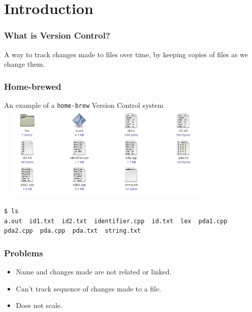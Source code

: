 \documentclass[14pt,compress]{beamer}
\newcommand{\typ}[1]{\lstinline{#1}}
\begin{document}

\section{Introduction}

\begin{frame}
  \frametitle{What is Version Control?}
  \begin{block}{}
    A way to track changes made to files over time, by keeping copies
    of files as we change them.
  \end{block}
\end{frame}

\begin{frame}[fragile]
  \frametitle{Home-brewed}
  \begin{center}
    An example of a \typ{home-brew} Version Control system
    \includegraphics[height=1.8in,width=4.2in]{../images/folder.png}
  \end{center}
  \begin{lstlisting} 
$ ls
a.out  id1.txt  id2.txt  identifier.cpp  id.txt  lex  pda1.cpp  pda2.cpp  pda.cpp  pda.txt  string.txt
  \end{lstlisting} %
\end{frame}

\begin{frame}[fragile]
  \frametitle{Problems}  
  \begin{block}{}    
  \begin{itemize}
  \item Name and changes made are not related or linked. 
  \item Can't track sequence of changes made to a file. 
  \item Does not scale. 
  \end{itemize}
    \end{block}
\end{frame}
\end{document}
